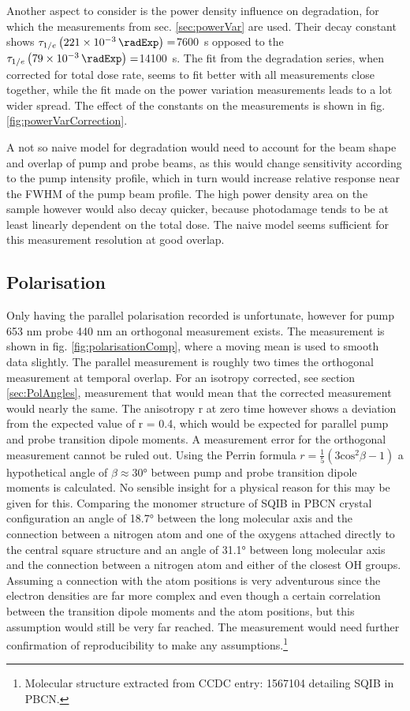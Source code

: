 \documentclass[twoside,openright]{scrreprt}
\begin{document}
Another aspect to consider is the power density influence on degradation, for which the measurements from sec. \ref{sec:powerVar} are used.  Their decay constant shows $\tau_{1/e}\left(\SI{221e-3}{\radExp}\right)=$\SI{7600}{\second}  opposed to the $\tau_{1/e}\left(\SI{79e-3}{\radExp}\right)=$\SI{14100}{\second}. The fit from the degradation series, when corrected for total dose rate, seems to fit better with all measurements close together, while the fit made on the power variation measurements leads to a lot wider spread. The effect of the constants on the measurements is shown in fig. \ref{fig:powerVarCorrection}.

A not so naive model for degradation would need to account for the beam shape and overlap of pump and probe beams, as this would change sensitivity according to the pump intensity profile, which in turn would increase relative response near the FWHM of the pump beam profile. The high power density area on the sample however would also decay quicker, because photodamage tends to be at least linearly dependent on the total dose. The naive model seems sufficient for this measurement resolution at good overlap.

\subsection{Polarisation}
Only having the parallel polarisation recorded is unfortunate, however for pump 653 nm probe 440 nm an orthogonal measurement exists. The measurement is shown in fig. \ref{fig:polarisationComp}, where a moving mean is used to smooth data slightly. The parallel measurement is roughly two times the orthogonal measurement at temporal overlap. For an isotropy corrected, see section \ref{sec:PolAngles}, measurement that would mean that the corrected measurement would nearly the same. The anisotropy r at zero time however shows a deviation from the expected value of r = 0.4, which would be expected for parallel pump and probe transition dipole moments. A measurement error for the orthogonal measurement cannot be ruled out. Using the Perrin formula $r = \frac{1}{5}(3\mathrm{cos}^2\beta-1)$ a hypothetical angle of $\beta \approx \ang{30}$ between pump and probe transition dipole moments is calculated. No sensible insight for a physical reason for this may be given for this. 
Comparing the monomer structure of SQIB in PBCN crystal configuration an angle of \ang{18.7} between the long molecular axis and the connection between a nitrogen atom and one of the oxygens attached directly to the central square structure and an angle of \ang{31.1} between long molecular axis and the connection between a nitrogen atom and either of the closest OH groups. Assuming a connection with the atom positions is very adventurous since the electron densities are far more complex and even though a certain correlation between the transition dipole moments and the atom positions, but this assumption would still be very far reached. The measurement would need further confirmation of reproducibility to make any assumptions.\footnote{Molecular structure extracted from CCDC entry: 1567104 detailing SQIB in PBCN.}
\end{document}
